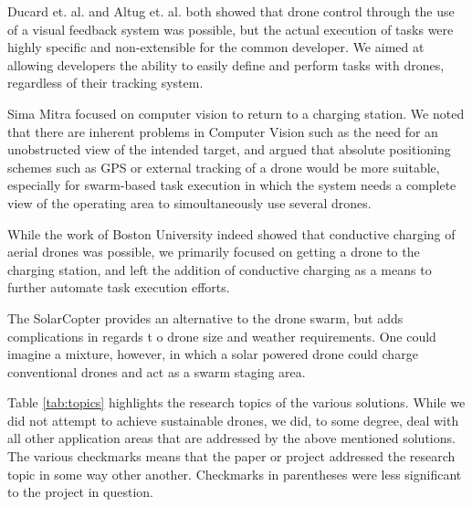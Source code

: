 Ducard et. al. and Altug et. al. both showed that drone control through the use of a visual feedback system was possible, but the actual execution of tasks were highly specific and non-extensible for the common developer. We aimed at allowing developers the ability to easily define and perform tasks with drones, regardless of their tracking system.

Sima Mitra focused on computer vision to return to a charging station. We noted that there are inherent problems in Computer Vision such as the need for an unobstructed view of the intended target, and argued that absolute positioning schemes such as GPS or external tracking of a drone would be more suitable, especially for swarm-based task execution in which the system needs a complete view of the operating area to simoultaneously use several drones.

While the work of Boston University indeed showed that conductive charging of aerial drones was possible, we primarily focused on getting a drone to the charging station, and left the addition of conductive charging as a means to further automate task execution efforts.

The SolarCopter provides an alternative to the drone swarm, but adds complications in regards t o drone size and weather requirements. One could imagine a mixture, however, in which a solar powered drone could charge conventional drones and act as a swarm staging area.

Table \ref{tab:topics} highlights the research topics of the various solutions. While we did not attempt to achieve sustainable drones, we did, to some degree, deal with all other application areas that are addressed by the above mentioned solutions. The various checkmarks means that the paper or project addressed the research topic in some way other another. Checkmarks in parentheses were less significant to the project in question.

